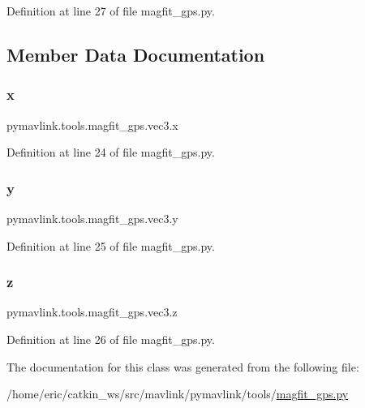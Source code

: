 Definition at line 27 of file magfit\+\_\+gps.\+py.



\subsection{Member Data Documentation}
\mbox{\label{classpymavlink_1_1tools_1_1magfit__gps_1_1vec3_a4ad87009521fb010ec5978e9f0efaf03}} 
\subsubsection{\texorpdfstring{x}{x}}
{\footnotesize\ttfamily pymavlink.\+tools.\+magfit\+\_\+gps.\+vec3.\+x}



Definition at line 24 of file magfit\+\_\+gps.\+py.

\mbox{\label{classpymavlink_1_1tools_1_1magfit__gps_1_1vec3_ad72ebec20299e4ea4125a12f2443334a}} 
\subsubsection{\texorpdfstring{y}{y}}
{\footnotesize\ttfamily pymavlink.\+tools.\+magfit\+\_\+gps.\+vec3.\+y}



Definition at line 25 of file magfit\+\_\+gps.\+py.

\mbox{\label{classpymavlink_1_1tools_1_1magfit__gps_1_1vec3_a33b7c1a48c1646258532de882dbe4540}} 
\subsubsection{\texorpdfstring{z}{z}}
{\footnotesize\ttfamily pymavlink.\+tools.\+magfit\+\_\+gps.\+vec3.\+z}



Definition at line 26 of file magfit\+\_\+gps.\+py.



The documentation for this class was generated from the following file\+:\begin{DoxyCompactItemize}
\item 
/home/eric/catkin\+\_\+ws/src/mavlink/pymavlink/tools/\mbox{\hyperlink{magfit__gps_8py}{magfit\+\_\+gps.\+py}}\end{DoxyCompactItemize}
